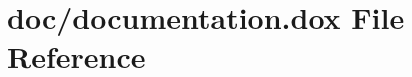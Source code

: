 \hypertarget{documentation_8dox}{}\section{doc/documentation.dox File Reference}
\label{documentation_8dox}
